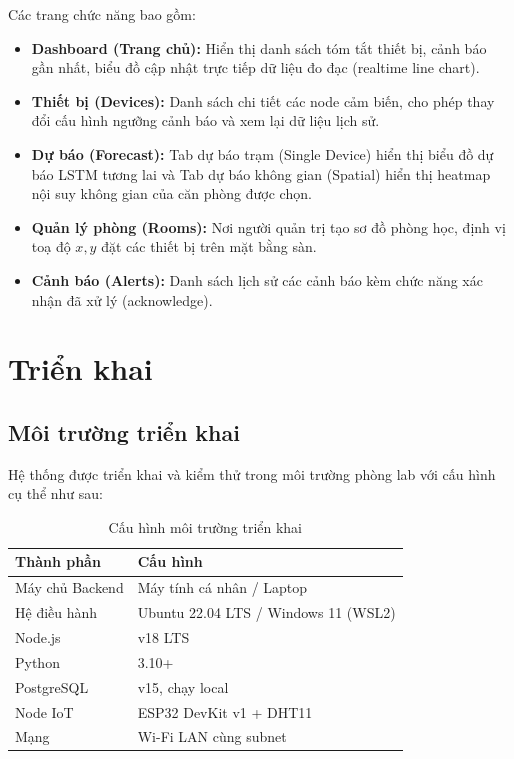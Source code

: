 Các trang chức năng bao gồm:
\begin{itemize}[leftmargin=2cm]
  \item \textbf{Dashboard (Trang chủ):} Hiển thị danh sách tóm tắt thiết bị, cảnh báo gần nhất, biểu đồ cập nhật trực tiếp dữ liệu đo đạc (realtime line chart).
  \item \textbf{Thiết bị (Devices):} Danh sách chi tiết các node cảm biến, cho phép thay đổi cấu hình ngưỡng cảnh báo và xem lại dữ liệu lịch sử.
  \item \textbf{Dự báo (Forecast):} Tab dự báo trạm (Single Device) hiển thị biểu đồ dự báo LSTM tương lai và Tab dự báo không gian (Spatial) hiển thị heatmap nội suy không gian của căn phòng được chọn.
  \item \textbf{Quản lý phòng (Rooms):} Nơi người quản trị tạo sơ đồ phòng học, định vị toạ độ $x, y$ đặt các thiết bị trên mặt bằng sàn.
  \item \textbf{Cảnh báo (Alerts):} Danh sách lịch sử các cảnh báo kèm chức năng xác nhận đã xử lý (acknowledge).
\end{itemize}

\section{Triển khai}
\label{sec:design:deploy}

\subsection{Môi trường triển khai}
\label{subsec:design:deploy:env}

Hệ thống được triển khai và kiểm thử trong môi trường phòng lab với cấu hình cụ thể như sau:

\begin{table}[H]
  \centering
  \caption{Cấu hình môi trường triển khai}
  \label{tab:deploy_env}
  \begin{tabular}{ll}
    \toprule
    \textbf{Thành phần} & \textbf{Cấu hình} \\
    \midrule
    Máy chủ Backend     & Máy tính cá nhân / Laptop \\
    Hệ điều hành        & Ubuntu 22.04 LTS / Windows 11 (WSL2) \\
    Node.js             & v18 LTS \\
    Python              & 3.10+ \\
    PostgreSQL          & v15, chạy local \\
    Node IoT            & ESP32 DevKit v1 + DHT11 \\
    Mạng                & Wi-Fi LAN cùng subnet \\
    \bottomrule
  \end{tabular}
\end{table}

